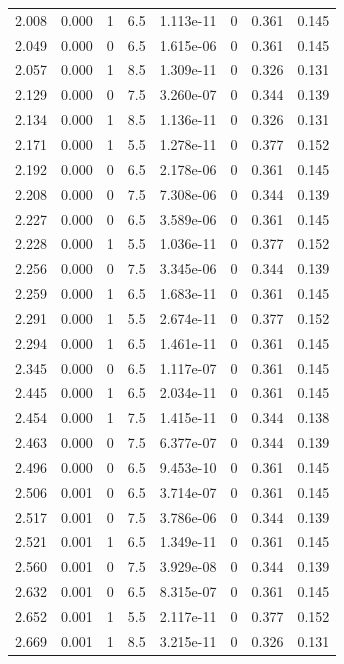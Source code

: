 \documentclass[preview]{standalone}
\begin{document}
{{{\begin{tabular}{L{1.2cm}C{1.2cm} C{0.3cm}C{0.5cm} C{1.4cm}C{1.4cm} C{1.4cm}C{1.4cm}}
  2.008  &  0.000  & 1     & 6.5 &  1.113e-11  & 0  & 0.361 &  0.145   \\ 
  2.049  &  0.000  & 0     & 6.5 &  1.615e-06  & 0  & 0.361 &  0.145   \\ 
  2.057  &  0.000  & 1     & 8.5 &  1.309e-11  & 0  & 0.326 &  0.131   \\ 
  2.129  &  0.000  & 0     & 7.5 &  3.260e-07  & 0  & 0.344 &  0.139   \\ 
  2.134  &  0.000  & 1     & 8.5 &  1.136e-11  & 0  & 0.326 &  0.131   \\ 
  2.171  &  0.000  & 1     & 5.5 &  1.278e-11  & 0  & 0.377 &  0.152   \\ 
  2.192  &  0.000  & 0     & 6.5 &  2.178e-06  & 0  & 0.361 &  0.145   \\ 
  2.208  &  0.000  & 0     & 7.5 &  7.308e-06  & 0  & 0.344 &  0.139   \\ 
  2.227  &  0.000  & 0     & 6.5 &  3.589e-06  & 0  & 0.361 &  0.145   \\ 
  2.228  &  0.000  & 1     & 5.5 &  1.036e-11  & 0  & 0.377 &  0.152   \\ 
  2.256  &  0.000  & 0     & 7.5 &  3.345e-06  & 0  & 0.344 &  0.139   \\ 
  2.259  &  0.000  & 1     & 6.5 &  1.683e-11  & 0  & 0.361 &  0.145   \\ 
  2.291  &  0.000  & 1     & 5.5 &  2.674e-11  & 0  & 0.377 &  0.152   \\ 
  2.294  &  0.000  & 1     & 6.5 &  1.461e-11  & 0  & 0.361 &  0.145   \\ 
  2.345  &  0.000  & 0     & 6.5 &  1.117e-07  & 0  & 0.361 &  0.145   \\ 
  2.445  &  0.000  & 1     & 6.5 &  2.034e-11  & 0  & 0.361 &  0.145   \\ 
  2.454  &  0.000  & 1     & 7.5 &  1.415e-11  & 0  & 0.344 &  0.138   \\ 
  2.463  &  0.000  & 0     & 7.5 &  6.377e-07  & 0  & 0.344 &  0.139   \\ 
  2.496  &  0.000  & 0     & 6.5 &  9.453e-10  & 0  & 0.361 &  0.145   \\ 
  2.506  &  0.001  & 0     & 6.5 &  3.714e-07  & 0  & 0.361 &  0.145   \\ 
  2.517  &  0.001  & 0     & 7.5 &  3.786e-06  & 0  & 0.344 &  0.139   \\ 
  2.521  &  0.001  & 1     & 6.5 &  1.349e-11  & 0  & 0.361 &  0.145   \\ 
  2.560  &  0.001  & 0     & 7.5 &  3.929e-08  & 0  & 0.344 &  0.139   \\ 
  2.632  &  0.001  & 0     & 6.5 &  8.315e-07  & 0  & 0.361 &  0.145   \\ 
  2.652  &  0.001  & 1     & 5.5 &  2.117e-11  & 0  & 0.377 &  0.152   \\ 
  2.669  &  0.001  & 1     & 8.5 &  3.215e-11  & 0  & 0.326 &  0.131   \\ 
\hline 
\end{tabular} 

}}}
\end{document}
